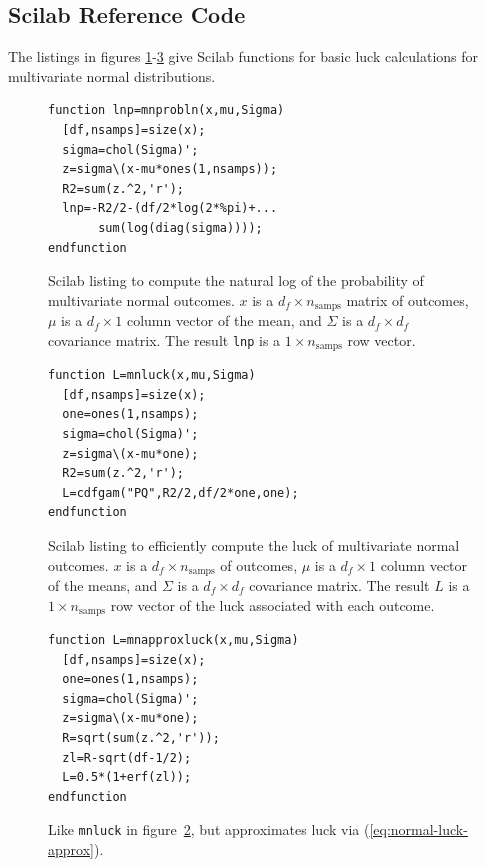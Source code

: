 \subsection{Scilab Reference Code}

The listings in figures \ref{fig:mnprobln}-\ref{fig:mnapproxluck} give Scilab functions for basic luck calculations for multivariate normal distributions.

\begin{figure}
\caption{\label{fig:mnprobln}Scilab listing to compute the natural log of the probability of multivariate normal outcomes.  $x$ is a $d_f \times n_{\text{samps}}$ matrix of outcomes, $\mu$ is a $d_f \times 1$ column vector of the mean, and $\Sigma$ is a $d_f \times d_f$ covariance matrix.  The result {\tt lnp} is a $1 \times n_{\text{samps}}$ row vector.}
\lstset{language=Scilab}
\begin{lstlisting}
function lnp=mnprobln(x,mu,Sigma)
  [df,nsamps]=size(x);
  sigma=chol(Sigma)';
  z=sigma\(x-mu*ones(1,nsamps));
  R2=sum(z.^2,'r');
  lnp=-R2/2-(df/2*log(2*%pi)+...
       sum(log(diag(sigma))));
endfunction
\end{lstlisting}
\end{figure}

\begin{figure}
\caption{\label{fig:mnluck}Scilab listing to efficiently compute the luck of multivariate normal outcomes.  $x$ is a $d_f \times n_{\text{samps}}$ of outcomes, $\mu$ is a $d_f \times 1$ column vector of the means, and $\Sigma$ is a $d_f \times d_f$ covariance matrix.  The result $L$ is a $1 \times n_{\text{samps}}$ row vector of the luck associated with each outcome.}
\lstset{language=Scilab}
\begin{lstlisting}
function L=mnluck(x,mu,Sigma)
  [df,nsamps]=size(x);
  one=ones(1,nsamps);
  sigma=chol(Sigma)';
  z=sigma\(x-mu*one);
  R2=sum(z.^2,'r');
  L=cdfgam("PQ",R2/2,df/2*one,one);
endfunction
\end{lstlisting}
\end{figure}

\begin{figure}
\caption{\label{fig:mnapproxluck}Like {\tt mnluck} in figure~\ref{fig:mnluck}, but approximates luck via (\ref{eq:normal-luck-approx}).}
\lstset{language=Scilab}
\begin{lstlisting}
function L=mnapproxluck(x,mu,Sigma)
  [df,nsamps]=size(x);
  one=ones(1,nsamps);
  sigma=chol(Sigma)';
  z=sigma\(x-mu*one);
  R=sqrt(sum(z.^2,'r'));
  zl=R-sqrt(df-1/2);
  L=0.5*(1+erf(zl));
endfunction
\end{lstlisting}
\end{figure}

